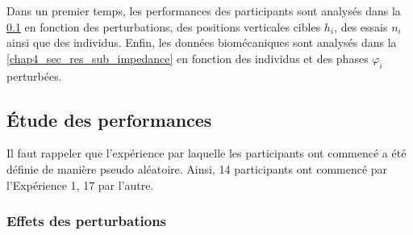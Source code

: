 Dans un premier temps, les performances des participants sont analysés dans la \cref{chap4_sec_res_sub_task} en fonction des perturbations, des positions verticales cibles $h_i$, des essais $n_i$ ainsi que des individus. Enfin, les données biomécaniques sont analysés dans la \cref{chap4_sec_res_sub_impedance} en fonction des individus et des phases $\varphi_i$ perturbées.



\subsection{Étude des performances} \label{chap4_sec_res_sub_task}

Il faut rappeler que l'expérience par laquelle les participants ont commencé a été définie de manière pseudo aléatoire. Ainsi, 14 participants ont commencé par l'Expérience 1, 17 par l'autre. 


\subsubsection{Effets des perturbations} \label{chap4_sec_res_sub_task_1}


